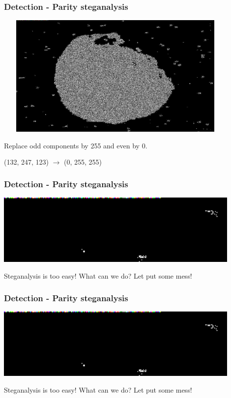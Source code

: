 \documentclass[]{beamer}
\begin{document}
\begin{frame}
\frametitle{Detection - Parity steganalysis}
\begin{center}
    \includegraphics[height=6.0cm, width=12.0cm]{./images/vesta_steg.png}
\end{center}
Replace odd components by 255 and even by 0.

(132, 247, 123) $\longrightarrow$ (0, 255, 255)
\end{frame}

\begin{frame}
\frametitle{Detection - Parity steganalysis}
\begin{center}
    \includegraphics[width=12.0cm]{./images/vesta_steg_zoom.png}
\end{center}
\bigskip
Steganalysis is too easy! What can we do? Let put some mess!
\end{frame}

\begin{frame}
\frametitle{Detection - Parity steganalysis}
\begin{center}
\includegraphics[width=12.0cm]{./images/vesta_steg_zoom.png}
\end{center}
\bigskip
Steganalysis is too easy! What can we do? Let put some mess!
\end{frame}
\end{document}
